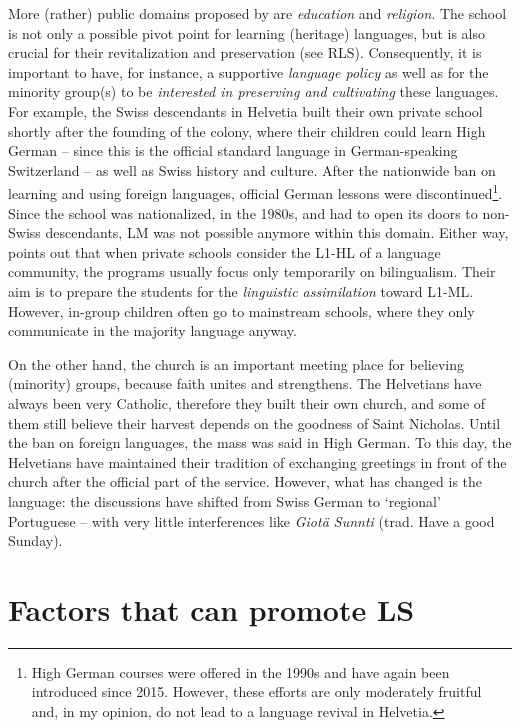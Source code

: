 \documentclass[output=paper,
modfonts
]{langscibook}
\begin{document}
More (rather) public domains proposed by \cite{Fishman1972} are \emph{education} and \emph{religion}. The school is not only a possible pivot point for learning (heritage) languages, but is also crucial for their revitalization and preservation (see RLS). Consequently, it is important to have, for instance, a supportive \emph{language policy} as well as for the minority group(s) to be \emph{interested in preserving and cultivating} these languages. For example, the Swiss descendants in Helvetia \parencite{Karnopp} built their own private school shortly after the founding of the colony, where their children could learn High German -- since this is the official standard language in German-speaking Switzerland -- as well as Swiss history and culture. After the nationwide ban on learning and using foreign languages, official German lessons were discontinued\footnote{High German courses were offered in the 1990s and have again been introduced since 2015. However, these efforts are only moderately fruitful and, in my opinion, do not lead to a language revival in Helvetia.}. Since the school was nationalized, in the 1980s, and had to open its doors to non-Swiss descendants, LM  was not possible anymore within this domain. Either way, \cite[95-96]{Pauwels2016} points out that when private schools consider the L1-HL of a language community, the programs usually focus only temporarily on bilingualism. Their aim is to prepare the students for the \emph{linguistic assimilation} toward L1-ML. However, in-group children often go to mainstream schools, where they only communicate in the majority language anyway.

On the other hand, the church is an important meeting place for believing (minority) groups, because faith unites and strengthens. The Helvetians have always been very Catholic, therefore they built their own church, and some of them still believe their harvest depends on the goodness of Saint Nicholas. Until the ban on foreign languages, the mass was said in High German. To this day, the Helvetians have maintained their tradition of exchanging greetings in front of the church after the official part of the service. However, what has changed is the language: the discussions have shifted from Swiss German to ‘regional' Portuguese -- with very little interferences like \emph{Giotä Sunnti} (trad. Have a good Sunday).

\section{Factors that can promote LS}
\label{factors}
\end{document}
